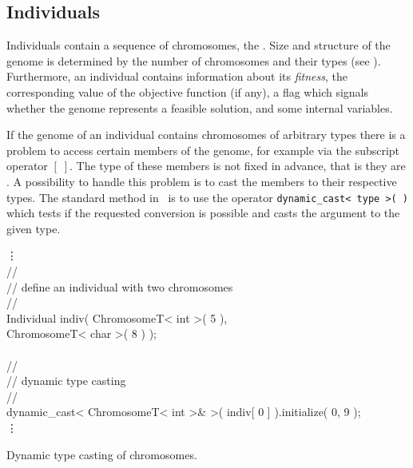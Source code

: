         \subsection{Individuals}

Individuals contain a sequence of chromosomes, the
\emph{}.  Size and structure of the genome is determined
by the number of chromosomes and their types (see
).  Furthermore, an individual
contains information about its \emph{fitness}, the corresponding value
of the objective function (if any), a flag which signals whether the
genome represents a feasible solution, and some internal variables.

If the genome of an individual contains chromosomes of
arbitrary types there is a problem to access certain members of the
genome, for example via the subscript operator $[\;]$. The type of
these members is not fixed in advance, that is they are
\emph{}. A possibility to handle this problem is
to cast the members to their respective types. The standard method in
\cpp\ is to use the operator \texttt{dynamic\_cast< type >( )}
which tests if the requested conversion is possible and casts the
argument to the given type.

\begin{example}
\begin{shortlisting}
            \vdots\\
//\\
// {\rm define an individual with two chromosomes}\\
//\\
Individual indiv( ChromosomeT< int  >( 5 ),\\
                  ChromosomeT< char >( 8 ) );\\
\\
//\\
// {\rm dynamic type casting}\\
//\\
dynamic\_cast< ChromosomeT< int >\& >( indiv[ 0 ] ).initialize( 0, 9 );\hspace*{-10cm}\\
            \vdots\\
\end{shortlisting}
\vspace{-10pt}\caption[Dynamic Type Casting of Chromosomes]{
    \label{datastruct:example:dynamic-cast}
    Dynamic type casting of chromosomes.
}
\end{example}

